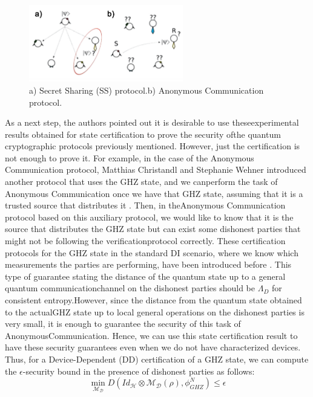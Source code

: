 \documentclass[12pt]{article}
\begin{document}
    \vspace{-2ex}
    \begin{figure}[ht]
        \centering
        \includegraphics[width=0.6\textwidth]{figures/images/img-4.pdf}
        \vspace{-3.5ex}
        \caption{\centering a) Secret Sharing (SS) protocol.\break b) Anonymous Communication protocol.}
    \end{figure}

    \noindent As a next step, the authors pointed out it is desirable to use these\break experimental results obtained for state certification to prove the security of\break the quantum cryptographic protocols previously mentioned. However, just the certification is not enough to prove it. For example, in the case of the Anonymous Communication protocol, Matthias Christandl and Stephanie Wehner introduced another protocol that uses the GHZ state, and we can\break perform the task of Anonymous Communication once we have that GHZ state, assuming that it is a trusted source that distributes it \cite{christandl-wehner:quantum-anonymous-transmissions:2005:02-2024}. Then, in the\break Anonymous Communication protocol based on this auxiliary protocol, we would like to know that it is the source that distributes the GHZ state but can exist some dishonest parties that might not be following the verification\break protocol correctly. These certification protocols for the GHZ state in the standard DI scenario, where we know which measurements the parties are performing, have been introduced before \cite{unnikrishnan-macfarlane-yi-diamanti-markham-kerenidis:anonymity-practical-quantum-networks:2019:02-2024}. This type of guarantee stating the distance of the quantum state up to a general quantum communication\break channel on the dishonest parties should be ${\Lambda}_{D}
    $ for consistent entropy.\break However, since the distance from the quantum state obtained to the actual\break GHZ state up to local general operations on the dishonest parties is very small, it is enough to guarantee the security of this task of Anonymous\break Communication. Hence, we can use this state certification result to have these security guarantees even when we do not have characterized devices. Thus, for a Device-Dependent (DD) certification of a GHZ state, we can compute the $\epsilon$-security bound in the presence of dishonest parties as follows:
    $$ \min_{{\mathcal{M}}_{\mathcal{D}}} D\left( {Id}_{\mathcal{H}} \otimes {\mathcal{M}}_{\mathcal{D}}(\rho), {\phi}_{GHZ}^{N} \right) \leq \epsilon $$
\end{document}
